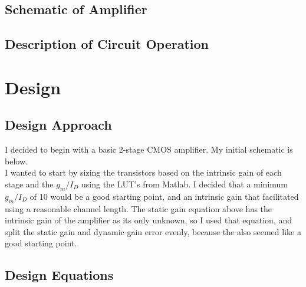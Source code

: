 \documentclass[12pt, fleqn]{article}
\begin{document}
\subsection{Schematic of Amplifier}
\newpage
\subsection{Description of Circuit Operation}
\newpage
\section{Design}
\subsection{Design Approach}
I decided to begin with a basic 2-stage CMOS amplifier.  My initial schematic is below.\\[0.25cm]
I wanted to start by sizing the transistors based on the intrinsic gain of each stage and the $g_m / I_D$ using the LUT's from Matlab.  I decided that a minimum $g_m / I_D$ of 10 would be a good starting point, and an intrinsic gain that facilitated using a reasonable channel length.  The static gain equation above has the intrinsic gain of the amplifier as its only unknown, so I used that equation, and split the static gain and dynamic gain error evenly, because the also seemed like a good starting point.
\newpage
\subsection{Design Equations}
\newpage
\end{document}
